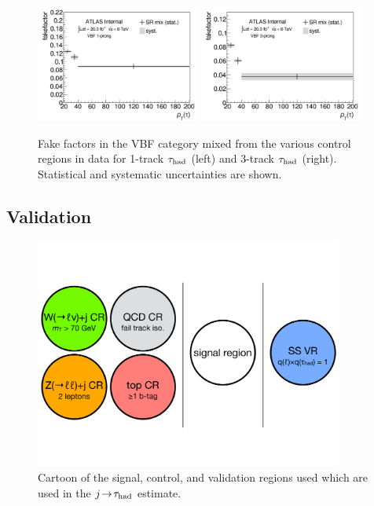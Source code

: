 \begin{figure}[tp]
  \centering
  \includegraphics[width=0.48\textwidth]{figures/backgrounds/fakefactor_8TeV_vbf_1p_mix}
  \includegraphics[width=0.48\textwidth]{figures/backgrounds/fakefactor_8TeV_vbf_3p_mix}
  \caption{Fake factors in the VBF category mixed from the various control regions in data for 1-track $\tau_\text{had}$ (left) and 3-track $\tau_\text{had}$ (right). Statistical and systematic uncertainties are shown.}
  \label{fig:backgrounds-fakefactorsVBFmix}
\end{figure}

\clearpage

\subsection{Validation}

\begin{figure}[tp]
  \centering
  \includegraphics[width=0.90\textwidth]{figures/backgrounds/regions-cartoon}
  \caption{Cartoon of the signal, control, and validation regions used which are used in the $j\!\rightarrow\!\tau_\text{had}$ estimate.}
  \label{fig:backgrounds-regions}
\end{figure}

